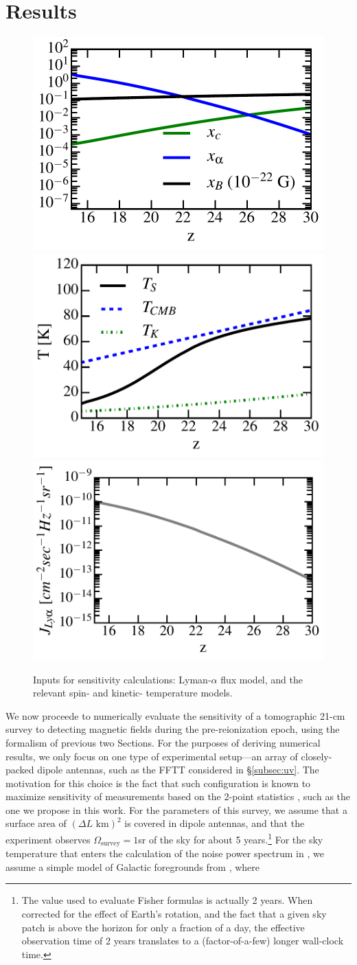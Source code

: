 \section{Results}
\label{sec:results}

\begin{figure}
\centering
\includegraphics[width=.35\textwidth,keepaspectratio=true]{xs_midFSTAR.pdf}
\includegraphics[width=.35\textwidth,keepaspectratio=true]{Ts_midFSTAR.pdf}
\includegraphics[width=.35\textwidth,keepaspectratio=true]{Jlya_midFSTAR.pdf}
\caption{Inputs for sensitivity calculations: Lyman-$\alpha$ flux model, and the relevant spin- and kinetic- temperature models. \label{fig:cosmo}}
\end{figure}
We now proceede to numerically evaluate the sensitivity of a tomographic 21-cm survey to detecting magnetic fields during the pre-reionization epoch, using the formalism of previous two Sections. For the purposes of deriving numerical results, we only focus on one type of experimental setup---an array of closely-packed dipole antennas, such as the FFTT considered in \S\ref{subsec:uv}. The motivation for this choice is the fact that such configuration is known to maximize sensitivity of measurements based on the 2-point statistics \cite{2009PhRvD..79h3530T}, such as the one we propose in this work. For the parameters of this survey, we assume that a surface area of $(\Delta L\text{ km})^2$ is covered in dipole antennas, and that the experiment observes $\Omega_\text{survey}=1$sr of the sky for about 5 years.\footnote{The value used to evaluate Fisher formulas is actually 2 years. When corrected for the effect of Earth's rotation, and the fact that a given sky patch is above the horizon for only a fraction of a day, the effective observation time of 2 years translates to a (factor-of-a-few) longer wall-clock time.} For the sky temperature that enters the calculation of the noise power spectrum in \eq{\ref{eq:Pnoise_K}}, we assume a simple model of Galactic foregrounds from \cite{2008PhRvD..78b3529M}, where
